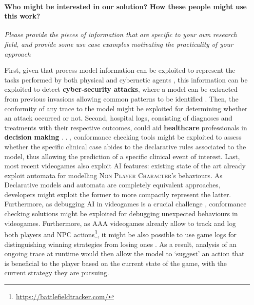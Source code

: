 \paragraph*{Who might be interested in our solution? How these people might use this work?} \textit{Please provide the pieces of information that are specific to your own research field, and provide some use case examples motivating the practicality of your approach}  

 First, given that process model information can be exploited to represent the tasks performed by both physical and cybernetic agents \cite{Ioanna}, this information can be exploited to detect \textbf{cyber-security attacks}, where a model can be extracted from previous invasions allowing common patterns to be identified \cite{BENASHER201551,LagraaS20}. Then, the conformity of any trace to the model might be exploited for determining whether an attack occurred or not. Second,  hospital logs, consisting of diagnoses and treatments with their respective outcomes, could aid \textbf{healthcare} professionals in  \textbf{decision making} \cite{Amantea2020}.  \cite{mining,KusumaKMHGJ20}. , conformance checking tools might be exploited to assess whether the specific clinical case abides to the declarative rules associated to the model, thus allowing the prediction of a specific clinical event of interest. Last, most recent videogames also exploit AI features: existing state of the art already exploit automata \cite{Miyake2017} for modelling \textsc{Non Player Character}'s behaviours. As Declarative models and automata are completely equivalent approaches, developers might exploit the former to more compactly represent the latter. Furthermore, as debugging AI in videogames is a crucial challenge \cite{john2019debugging}, conformance checking solutions might be exploited for debugging unexpected behaviours in videogames. Furthermore, as AAA videogames already allow to track and log both players and NPC actions\footnote{\url{https://battlefieldtracker.com/}}, it might be also possible to use game logs for distinguishing winning strategies from losing ones \cite{mining}. As a result, analysis of an ongoing trace at runtime would then allow the model to `suggest' an action that is beneficial to the player based on the current state of the game, with the current strategy they are pursuing.

